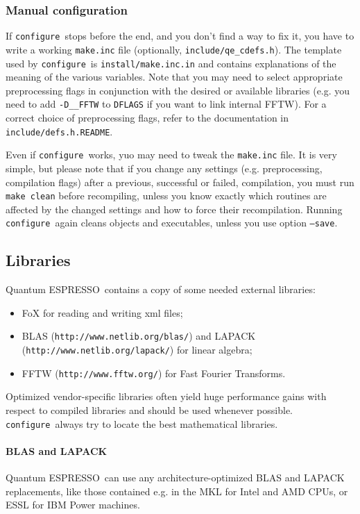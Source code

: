 \documentclass[12pt,a4paper]{article}
\def\qe{{\sc Quantum ESPRESSO}}
\def\configure{\texttt{configure}}
\begin{document}
\subsubsection{Manual configuration}
\label{SubSec:manconf}
If \configure\ stops before the end, and you don't find a way to fix
it, you have to write a working \texttt{make.inc} file (optionally,
\texttt{include/qe\_cdefs.h}). The template used by \configure\ is
\texttt{install/make.inc.in} and contains explanations of the meaning
of the various variables. Note that you may need
to select appropriate preprocessing flags
in conjunction with the desired or available
libraries (e.g. you need to add \texttt{-D\_\_FFTW} to \texttt{DFLAGS}
if you want to link internal FFTW). For a correct choice of preprocessing
flags, refer to the documentation in \texttt{include/defs.h.README}.

Even if \configure\ works, yuo may need to tweak the \texttt{make.inc}
file. It is very simple, but please note that if you change any settings
(e.g. preprocessing, compilation flags)
after a previous, successful or failed, compilation, you must run
\texttt{make clean} before recompiling, unless you know exactly which
routines are affected by the changed settings and how to force their
recompilation. Running \configure\ again cleans objects and executables,
unless you use option \texttt{--save}.

\subsection{Libraries}
\label{Sec:Libraries}

\qe\ contains a copy of some needed external libraries:
\begin{itemize}
 \item FoX for reading and writing xml files;
 \item BLAS (\texttt{http://www.netlib.org/blas/}) and LAPACK
  (\texttt{http://www.netlib.org/lapack/}) for linear algebra;
\item FFTW (\texttt{http://www.fftw.org/}) for Fast Fourier Transforms.
\end{itemize}
Optimized vendor-specific libraries often yield huge performance gains
with respect to compiled libraries and should be used whenever
possible. \configure\ always try to locate the best mathematical
libraries.
\\

\paragraph{BLAS and LAPACK}
\qe\ can use any architecture-optimized BLAS and LAPACK replacements,
like those contained e.g. in the MKL for Intel and AMD CPUs, or
ESSL for IBM Power machines.
\end{document}
